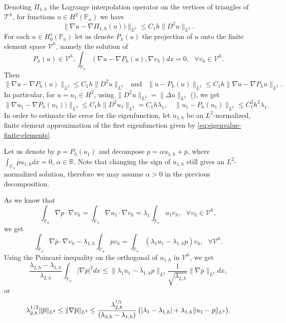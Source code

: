 \documentclass[JEP,XML,SOM,Unicode,ThmDefs,NoFloatCountersInSection,published]{cedram}
\theoremstyle{plain}
\theoremstyle{definition}
\def\R{\mathbb{R}}
\def\Pp{{\mathbb{P}_n}}
\newcommand{\lb}{\lambda}
\begin{document}
Denoting $\Pi_{1,h}$ the Lagrange interpolation operator on the vertices of triangles of~${\mathcal T}^h$, for functions $u \in H^2(\Pp)$ we have
\[
\|\nabla u-\nabla \Pi_{1,h} (u)) \|_{L^2} \le C_1 h \|D^2 u\|_{L^2}.
\]
For each $u \in H^1_0(\Pp)$ let us denote $P_h(u)$ the projection of $u$ onto the finite element space $\mathcal V^h$, namely the solution of
\begin{equation}
P_h(u) \in \mathcal V^h, \int_{\Pp} (\nabla u- \nabla P_h(u), \nabla v_h)dx =0,\ \ \ \forall v_h \in \mathcal V^h.
\label{eq:projection-h}
\end{equation}
Then
\begin{equation}\label{eq:u-phu}
\|\nabla u- \nabla P_h(u) \|_{L^2} \le C_1 h \|D^2 u\|_{L^2} \ \ \text{ and } \ \ \|u-P_h(u)\|_{L^2} \leq C_1h \|\nabla u- \nabla P_hu\|_{L^2}.
\end{equation}
In particular, for $u = u_1 \in H^2$, using $\|D^2u\|_{L^2} = \|\Delta u\|_{L^2}$ (\cite[Th.\,4.3.1.4]{grisvard}), we get
\begin{equation}\label{eq:error_xuefeng}
\|\nabla u_1-\nabla P_h(u_1)) \|_{L^2} \le C_1 h \|D^2 u_1\|_{L^2} = C_1 h\lambda_1,\quad \|u_1-P_h(u_1)\|_{L^2} \leq C_1^2h^2 \lambda_1.
\end{equation}
In order to estimate the error for the eigenfunction, let $u_{1,h}$ be an $L^2$-normalized, finite element approximation of the first eigenfunction given by \eqref{eq:eigenvalue-finite-elements}.

Let us denote by $p= P_h(u_1)$ and decompose $p= \alpha u_{1,h}+ \overline p$, where $\int_ {\Pp} \overline p u_{1,h} dx =0$, $\alpha \in \R$. Note that changing the sign of $u_{1,h}$ still gives an $L^2$-normalized solution, therefore we may assume $\alpha>0$ in the previous decomposition.

As we know that
\[
\int_\Pp \nabla p \cdot \nabla v_h = \int_\Pp \nabla u_1 \cdot \nabla v_h = \lambda_1\int_\Pp u_1v_h, \ \ \ \forall v_h \in \mathcal V^h,
\]
we get
\[
\int_\Pp \nabla \overline p \cdot \nabla v_h - \lambda_{1,h} \int_\Pp \overline p v_h = \int_{\Pp} (\lb_1 u_1- \lb_{1, h}p)v_h, \ \ \ \forall \mathcal V^h.
\]
Using the Poincaré inequality on the orthogonal of $u_{1,h}$ in $\mathcal V^h$, we get
\[
\frac{\lambda_{2,h}-\lambda_{1,h}}{\lambda_{2,h}}\int_{\Pp} |\nabla \overline p|^2 dx \le \| \lb_1 u_1- \lb_{1, h}p\|_{L^2} \frac{1}{\sqrt{\lambda_{2,h}}} \|\nabla \overline p\|_{L^2} dx,
\]
or
\begin{equation}
\lambda_{2,h}^{1/2}\|\overline p\|_{L^2} \leq \|\nabla \overline p \|_{L^2} \le \frac{\lb_{2, h}^{\sfrac 12}}{(\lb_{2, h}-\lb_{1, h})}\,\big (|\lb_1-\lb_{1, h}|+ \lb_{1, h}\|u_1- p\|_{L^2}\big).
\label{eq:estimate-p-bar}
\end{equation}
\end{document}
